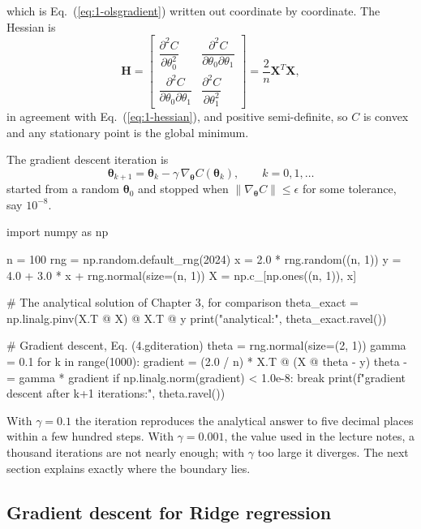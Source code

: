which is Eq.~(\ref{eq:1-olsgradient}) written out coordinate by coordinate.
The Hessian is
\begin{equation}
  \bm{H} = \begin{bmatrix}
    \dfrac{\partial^{2}C}{\partial\theta_0^{2}} &
    \dfrac{\partial^{2}C}{\partial\theta_0\partial\theta_1}\\[8pt]
    \dfrac{\partial^{2}C}{\partial\theta_0\partial\theta_1} &
    \dfrac{\partial^{2}C}{\partial\theta_1^{2}}
  \end{bmatrix}
   = \frac{2}{n}\bm{X}^{T}\bm{X},
  \label{eq:4-gdhessian}
\end{equation}
in agreement with Eq.~(\ref{eq:1-hessian}), and positive semi-definite, so
$C$ is convex and any stationary point is the global minimum.

The gradient descent iteration is
\begin{equation}
  \bm{\theta}_{k+1} = \bm{\theta}_k - \gamma\,\nabla_{\bm{\theta}}C(\bm{\theta}_k),
  \qquad k=0,1,\dots
  \label{eq:4-gditeration}
\end{equation}
started from a random $\bm{\theta}_0$ and stopped when
$\|\nabla_{\bm{\theta}}C\|\le\epsilon$ for some tolerance, say $10^{-8}$.

\begin{Python}{}
import numpy as np

n = 100
rng = np.random.default_rng(2024)
x = 2.0 * rng.random((n, 1))
y = 4.0 + 3.0 * x + rng.normal(size=(n, 1))
X = np.c_[np.ones((n, 1)), x]

# The analytical solution of Chapter 3, for comparison
theta_exact = np.linalg.pinv(X.T @ X) @ X.T @ y
print("analytical:", theta_exact.ravel())

# Gradient descent, Eq. (4.gditeration)
theta = rng.normal(size=(2, 1))
gamma = 0.1
for k in range(1000):
    gradient = (2.0 / n) * X.T @ (X @ theta - y)
    theta -= gamma * gradient
    if np.linalg.norm(gradient) < 1.0e-8:
        break
print(f"gradient descent after {k+1} iterations:", theta.ravel())
\end{Python}

With $\gamma=0.1$ the iteration reproduces the analytical answer to five decimal
places within a few hundred steps.  With $\gamma=0.001$, the value used in the
lecture notes, a thousand iterations are not nearly enough; with
$\gamma$ too large it diverges.  The next section explains exactly where the
boundary lies.

\subsection{Gradient descent for Ridge regression}
\label{sec:gdridge}


